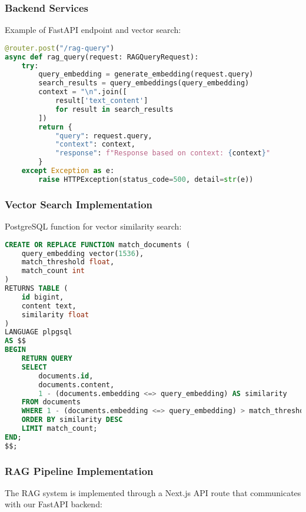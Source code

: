 \subsubsection{Backend Services}
Example of FastAPI endpoint and vector search:
\begin{lstlisting}[language=python,
                   basicstyle=\ttfamily\small,
                   keywordstyle=\color{blue},
                   stringstyle=\color{red},
                   commentstyle=\color{green!60!black}]
@router.post("/rag-query")
async def rag_query(request: RAGQueryRequest):
    try:
        query_embedding = generate_embedding(request.query)
        search_results = query_embeddings(query_embedding)
        context = "\n".join([
            result['text_content'] 
            for result in search_results
        ])
        return {
            "query": request.query,
            "context": context,
            "response": f"Response based on context: {context}"
        }
    except Exception as e:
        raise HTTPException(status_code=500, detail=str(e))
\end{lstlisting}

\subsubsection{Vector Search Implementation}
PostgreSQL function for vector similarity search:
\begin{lstlisting}[language=sql,
                   basicstyle=\ttfamily\small,
                   keywordstyle=\color{blue},
                   stringstyle=\color{red},
                   commentstyle=\color{green!60!black}]
CREATE OR REPLACE FUNCTION match_documents (
    query_embedding vector(1536),
    match_threshold float,
    match_count int
)
RETURNS TABLE (
    id bigint,
    content text,
    similarity float
)
LANGUAGE plpgsql
AS $$
BEGIN
    RETURN QUERY
    SELECT
        documents.id,
        documents.content,
        1 - (documents.embedding <=> query_embedding) AS similarity
    FROM documents
    WHERE 1 - (documents.embedding <=> query_embedding) > match_threshold
    ORDER BY similarity DESC
    LIMIT match_count;
END;
$$;
\end{lstlisting}

\subsubsection{RAG Pipeline Implementation}
The RAG system is implemented through a Next.js API route that communicates with our FastAPI backend:

